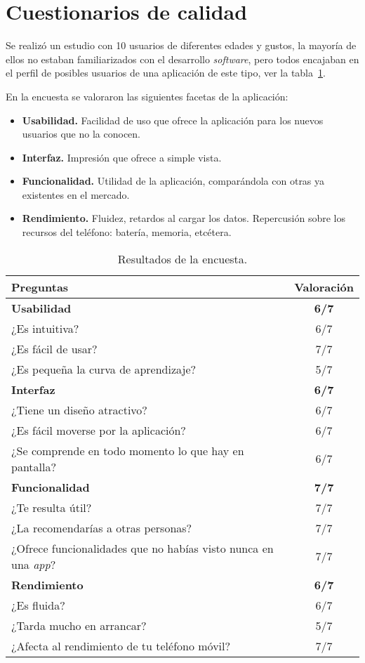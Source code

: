 \section{Cuestionarios de calidad}
Se realizó un estudio con 10 usuarios de diferentes edades y gustos, la mayoría de ellos no estaban familiarizados con el desarrollo \textit{software}, pero todos encajaban en el perfil de posibles usuarios de una aplicación de este tipo, ver la tabla~\ref{tab:encuesta}.

En la encuesta se valoraron las siguientes facetas de la aplicación:

\begin{itemize}
\item{}\textbf{Usabilidad.} Facilidad de uso que ofrece la aplicación para los nuevos usuarios que no la conocen.
\item{}\textbf{Interfaz.} Impresión que ofrece a simple vista.
\item{}\textbf{Funcionalidad.} Utilidad de la aplicación, comparándola con otras ya existentes en el mercado.
\item{}\textbf{Rendimiento.} Fluidez, retardos al cargar los datos. Repercusión sobre los recursos del teléfono: batería, memoria, etcétera.
\end{itemize}

\begin{table}[tbp]
\begin{center}
\small
\begin{tabular}{|l|c|}
\hline 
Preguntas & Valoración  \\
\hline 
\hline
\textbf{Usabilidad} & \textbf{6/7} \\
\hline
¿Es intuitiva? & 6/7 \\
\hline
¿Es fácil de usar? & 7/7 \\
\hline
¿Es pequeña la curva de aprendizaje? & 5/7 \\
\hline
\textbf{Interfaz} & \textbf{6/7} \\ 
\hline
¿Tiene un diseño atractivo? & 6/7 \\
\hline
¿Es fácil moverse por la aplicación? & 6/7 \\
\hline
¿Se comprende en todo momento lo que hay en pantalla? & 6/7 \\
\hline
\textbf{Funcionalidad} & \textbf{7/7} \\ 
\hline
¿Te resulta útil? & 7/7 \\
\hline
¿La recomendarías a otras personas? & 7/7 \\
\hline
¿Ofrece funcionalidades que no habías visto nunca en una \textit{app}? & 7/7 \\
\hline
\textbf{Rendimiento} & \textbf{6/7} \\ 
\hline
¿Es fluida? & 6/7 \\
\hline
¿Tarda mucho en arrancar? & 5/7 \\
\hline
¿Afecta al rendimiento de tu teléfono móvil? & 7/7 \\
\hline
\end{tabular}
\caption{Resultados de la encuesta.\label{tab:encuesta}}
\end{center}
\end{table}

